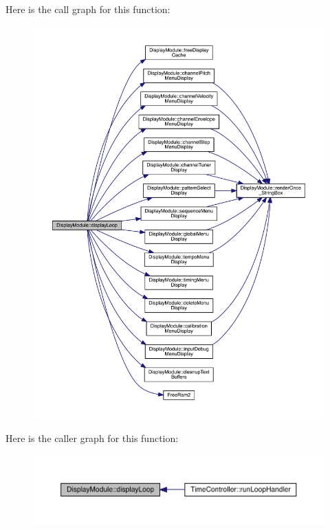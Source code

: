 Here is the call graph for this function\+:
\nopagebreak
\begin{figure}[H]
\begin{center}
\leavevmode
\includegraphics[width=350pt]{class_display_module_ab89f4bb8387cd4a0557b23ee14133568_cgraph}
\end{center}
\end{figure}
Here is the caller graph for this function\+:
\nopagebreak
\begin{figure}[H]
\begin{center}
\leavevmode
\includegraphics[width=350pt]{class_display_module_ab89f4bb8387cd4a0557b23ee14133568_icgraph}
\end{center}
\end{figure}
\mbox{\label{class_display_module_a4eb1fdb54d5ce4e0b8e460d30b443aac}} 
